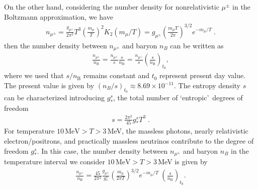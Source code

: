 On the other hand, considering the number density for nonrelativistic $\mu^\pm$ in the Boltzmann approximation, we have
\begin{align}\label{nmupm}
n_{\mu^\pm}=\frac{g_{\mu^\pm}}{2\pi^2}T^3\left(\frac{m_\mu}{T}\right)^2 K_2(m_\mu/T)=g_{\mu^\pm}\left(\frac{m_\mu T}{2\pi}\right)^{3/2}e^{-{m_\mu}/{T}}\;. 
\end{align}
then the number density between $n_{\mu^\pm}$ and baryon $n_B$ can be written as
\begin{align}
\frac{n_{\mu^\pm}}{n_\mathrm{B}}=\frac{n_{\mu^\pm}}{s}\frac{s}{n_\mathrm{B}}=
\frac{n_{\mu^\pm}}{s}\left(\frac{s}{n_\mathrm{B}}\right)_{\!t_0},
\end{align}
where we used that $s/n_\mathrm{B}$ remains constant and $t_0$ represent present day value. The present value is given by $(n_B/s)_{t_0}\approx8.69\times10^{-11}$. The entropy density $s$ can be characterized introducing $g^s_\ast$, the total number of \lq entropic\rq\ degrees of freedom
\begin{align}\label{entrop}
s=\frac{2\pi^2}{45}g^s_\ast T^3\;.
\end{align}
For temperature $10\,\mathrm{MeV} >T>3 $\,MeV, the massless photons, nearly relativistic electron/positrons, and practically massless neutrinos contribute to the degree of freedom $g^s_\ast$.  In this case, the number density between $n_{\mu^\pm}$ and baryon $n_B$ in the temperature interval we consider $10\,\mathrm{MeV} >T>3 $\,MeV is given by
\begin{align}\label{nmuperbF} 
\frac{n_{\mu^\pm}}{n_\mathrm{B}}=\frac{45}{2\pi^2}\frac{g_{\mu^\pm}}{g^s_\ast}\left(\frac{m_\mu}{2\pi T}\right)^{3/2}e^{-{m_\mu}/{T}}\;\left(\frac{s}{n_\mathrm{B}}\right)_{\!t_0}.
\end{align}


